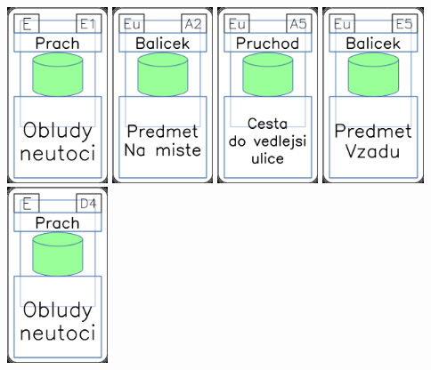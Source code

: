 \documentclass[a4paper]{article}
\begin{document}
	\includegraphics[width=3.0cm]{img-4_50}
	\includegraphics[width=3.0cm]{img-4_31}
	\includegraphics[width=3.0cm]{img-4_34}
	\includegraphics[width=3.0cm]{img-4_24}
	\includegraphics[width=3.0cm]{img-4_48}
\end{document}
